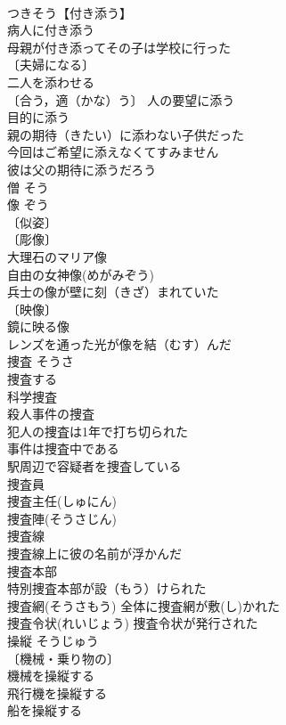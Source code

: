 \documentclass[8pt]{extreport}
\begin{document}
\begin{CJK}{UTF8}{min}
\\	つきそう【付き添う】 
\\	病人に付き添う 
\\	母親が付き添ってその子は学校に行った 
\\	〔夫婦になる〕
\\	二人を添わせる 
\\	〔合う，適（かな）う〕 人の要望に添う 
\\	目的に添う 
\\	親の期待（きたい）に添わない子供だった 
\\	今回はご希望に添えなくてすみません 
\\	彼は父の期待に添うだろう 
\\	僧	そう	
\\	像	ぞう	
\\	〔似姿〕
\\	〔彫像〕
\\	大理石のマリア像 
\\	自由の女神像(めがみぞう) 
\\	兵士の像が壁に刻（きざ）まれていた 
\\	〔映像〕
\\	鏡に映る像 
\\	レンズを通った光が像を結（むす）んだ 
\\	捜査	そうさ	
\\	捜査する 
\\	科学捜査 
\\	殺人事件の捜査 
\\	犯人の捜査は1年で打ち切られた 
\\	事件は捜査中である 
\\	駅周辺で容疑者を捜査している 
\\	捜査員 
\\	捜査主任(しゅにん) 
\\	捜査陣(そうさじん) 
\\	捜査線　
\\	捜査線上に彼の名前が浮かんだ 
\\	捜査本部 
\\	特別捜査本部が設（もう）けられた 
\\	捜査網(そうさもう) 全体に捜査網が敷(し)かれた 
\\	捜査令状(れいじょう) 捜査令状が発行された 
\\	操縦	そうじゅう	
\\	〔機械・乗り物の〕
\\	機械を操縦する 
\\	飛行機を操縦する 
\\	船を操縦する 

\end{CJK}
\end{document}
